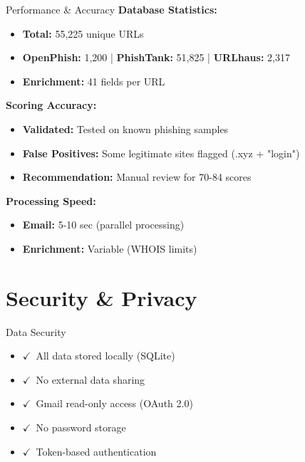 \documentclass[aspectratio=169]{beamer}
\newcommand{\cmark}{\textcolor{lowgreen}{$\checkmark$}}
\begin{document}
\begin{frame}{Performance \& Accuracy}
\small
\textbf{Database Statistics:}
\begin{itemize}
    \scriptsize
    \item \textbf{Total:} 55,225 unique URLs
    \item \textbf{OpenPhish:} 1,200 | \textbf{PhishTank:} 51,825 | \textbf{URLhaus:} 2,317
    \item \textbf{Enrichment:} 41 fields per URL
\end{itemize}

\vspace{0.2cm}
\textbf{Scoring Accuracy:}
\begin{itemize}
    \scriptsize
    \item \textbf{Validated:} Tested on known phishing samples
    \item \textbf{False Positives:} Some legitimate sites flagged (.xyz + "login")
    \item \textbf{Recommendation:} Manual review for 70-84 scores
\end{itemize}

\vspace{0.2cm}
\textbf{Processing Speed:}
\begin{itemize}
    \scriptsize
    \item \textbf{Email:} 5-10 sec (parallel processing)
    \item \textbf{Enrichment:} Variable (WHOIS limits)
\end{itemize}
\end{frame}

\section{Security \& Privacy}

\begin{frame}{Data Security}
\vspace{-0.4cm}
\small
\begin{itemize}
    \scriptsize
    \setlength\itemsep{-0.15em}
    \item \cmark\ All data stored locally (SQLite)
    \item \cmark\ No external data sharing
    \item \cmark\ Gmail read-only access (OAuth 2.0)
    \item \cmark\ No password storage
    \item \cmark\ Token-based authentication
\end{itemize}
\end{frame}
\end{document}
